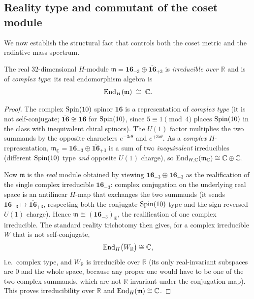 \subsection{Reality type and commutant of the coset module}
\label{sec:app-spectrum:reality}

We now establish the structural fact that controls both the coset metric
and the radiative mass spectrum.

\begin{theorem}
\label{thm:app-spectrum:complextype}
The real $32$-dimensional $H$-module
$\mathfrak m=\mathbf{16}_{-3}\oplus\overline{\mathbf{16}}_{+3}$ is
\emph{irreducible over $\mathbb R$} and is of \emph{complex type}: its
real endomorphism algebra is
\[
  \operatorname{End}_H(\mathfrak m)\;\cong\;\mathbb C .
\]
\end{theorem}

\begin{proof}
The complex $\operatorname{Spin}(10)$ spinor $\mathbf{16}$ is a representation of
\emph{complex type} (it is not self-conjugate;
$\overline{\mathbf{16}}\not\cong\mathbf{16}$ for $\operatorname{Spin}(10)$, since
$5\equiv1\pmod 4$ places $\operatorname{Spin}(10)$ in the class with inequivalent chiral
spinors). The $U(1)$ factor multiplies the two summands by the opposite
characters $e^{-3i\theta}$ and $e^{+3i\theta}$. As a \emph{complex}
$H$-representation, $\mathfrak m_{\mathbb C}=\mathbf{16}_{-3}\oplus
\overline{\mathbf{16}}_{+3}$ is a sum of two \emph{inequivalent}
irreducibles (different $\operatorname{Spin}(10)$ type \emph{and} opposite $U(1)$
charge), so $\operatorname{End}_{H,\mathbb C}(\mathfrak m_{\mathbb C})\cong
\mathbb C\oplus\mathbb C$.

Now $\mathfrak m$ is the \emph{real} module obtained by viewing
$\mathbf{16}_{-3}\oplus\overline{\mathbf{16}}_{+3}$ as the realification
of the single complex irreducible $\mathbf{16}_{-3}$: complex conjugation
on the underlying real space is an antilinear $H$-map that exchanges the
two summands (it sends $\mathbf{16}_{-3}\mapsto\overline{\mathbf{16}}_{+3}$,
respecting both the conjugate $\operatorname{Spin}(10)$ type and the sign-reversed
$U(1)$ charge). Hence $\mathfrak m\cong(\mathbf{16}_{-3})_{\mathbb R}$,
the realification of one complex irreducible. The standard reality
trichotomy then gives, for a complex irreducible $W$ that is not
self-conjugate,
\[
  \operatorname{End}_H\bigl(W_{\mathbb R}\bigr)\cong\mathbb C ,
\]
i.e.\ complex type, and $W_{\mathbb R}$ is irreducible over $\mathbb R$
(its only real-invariant subspaces are $0$ and the whole space, because
any proper one would have to be one of the two complex summands, which are
not $\mathbb R$-invariant under the conjugation map). This proves
irreducibility over $\mathbb R$ and $\operatorname{End}_H(\mathfrak m)\cong\mathbb C$.
\end{proof}

